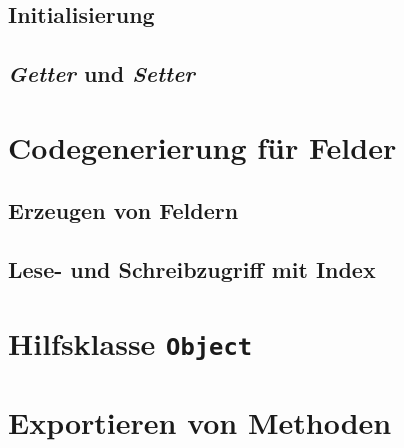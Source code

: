 \subsection{Initialisierung}
\subsection{\emph{Getter} und \emph{Setter}}

\section{Codegenerierung für Felder}
\subsection{Erzeugen von Feldern}
\subsection{Lese- und Schreibzugriff mit Index}

\section{Hilfsklasse \lstinline{Object}}

\section{Exportieren von Methoden}
